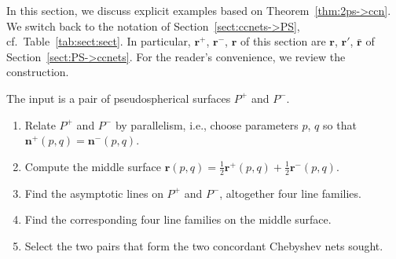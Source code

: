 \documentclass[pdftex]{sigma}
\let\ve\mathbf
\numberwithin{equation}{section}
\begin{document}
In this section, we discuss explicit examples based on
Theorem~\ref{thm:2ps->ccn}.
We switch back to the notation of Section~\ref{sect:ccnets->PS},
cf.\ Table~\ref{tab:sect:sect}.
In particular, $\ve r^+$, $\ve r^-$, $\ve r$ of this section are $\ve r$, $\ve r'$, $\bar{\ve r}$
of Section~\ref{sect:PS->ccnets}.
For the reader's convenience, we review the construction.

\begin{construction}
The input is a pair of pseudospherical surfaces $P^+$ and $P^-$.
\begin{enumerate}\itemsep=0pt\samepage
\item Relate $P^+$ and $P^-$ by parallelism, i.e., choose parameters $p$, $q$ so that
$\ve n^{+}(p,q) = \ve n^{-}(p,q)$.

\item Compute the middle surface
$\ve r(p,q) = \frac12 \ve r^+(p,q) + \frac12 \ve r^-(p,q)$.

\item Find the asymptotic lines on $P^+$ and $P^-$, altogether four line families.

\item Find the corresponding four line families on the middle surface.

\item Select the two pairs that form the two concordant Chebyshev nets sought.
\end{enumerate}
\end{construction}
\end{document}
